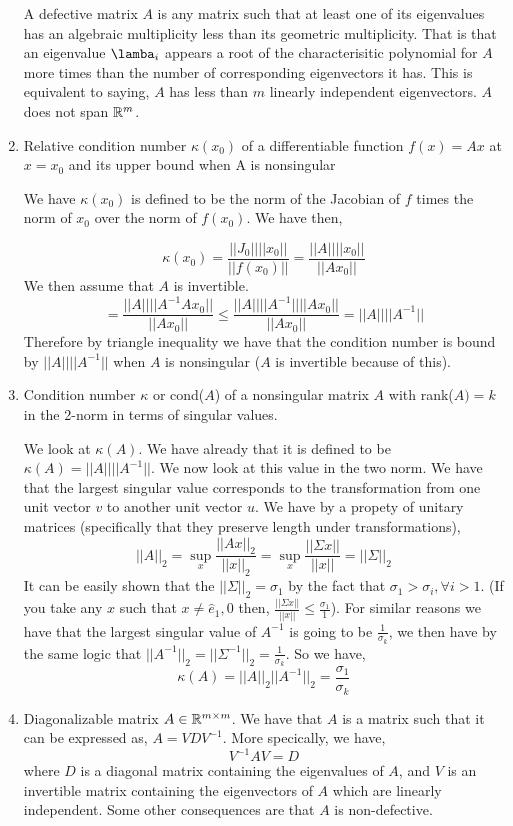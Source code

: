\documentclass{article}
\begin{document}
\begin{enumerate}
A defective matrix $A$ is any matrix such that at least one of its eigenvalues has an algebraic multiplicity less than its geometric multiplicity. That is that an eigenvalue $\lamba_i$ appears a root of the characterisitic polynomial for $A$ more times than the number of corresponding eigenvectors it has. This is equivalent to saying, $A$ has less than $m$ linearly independent eigenvectors. $A$ does not span $\mathbb{R}^{m}$. 

\item Relative condition number $\kappa(x_0)$ of a differentiable function $f(x) = Ax$ at $x = x_0$ and its upper bound when A is nonsingular

We have $\kappa(x_0)$ is defined to be the norm of the Jacobian of $f$ times the norm of $x_0$ over the norm of $f(x_0)$. We have then, 

\[
    \kappa(x_0) = \frac{||J_0||||x_0||}{||f(x_0)||} = \frac{||A||||x_0||}{||Ax_0||} 
\]
We then assume that $A$ is invertible. 
\[
     = \frac{||A||||A^{-1}Ax_0||}{||Ax_0||} \le \frac{||A||||A^{-1}||||Ax_0||}{||Ax_0||} = ||A||||A^{-1}||
\]
Therefore by triangle inequality we have that the condition number is bound by $||A||||A^{-1}||$ when $A$ is nonsingular ($A$ is invertible because of this). 

\item Condition number $\kappa$ or cond($A$) of a nonsingular matrix $A$ with rank($A) = k$ in the 2-norm in terms of singular values.

We look at $\kappa(A)$. We have already that it is defined to be $\kappa(A) = ||A||||A^{-1}||$. We now look at this value in the two norm. We have that the largest singular value corresponds to the transformation from one unit vector $v$ to another unit vector $u$. We have by a propety of unitary matrices (specifically that they preserve length under transformations), 
\[
    ||A||_2 = \sup_{x} \frac{||Ax||_2}{||x||_2} = \sup_x \frac{||\Sigma x||}{||x||} = ||\Sigma||_2
\]
It can be easily shown that the $||\Sigma||_2 = \sigma_1$ by the fact that $\sigma_1 > \sigma_i, \forall i>1$. (If you take any $x$ such that $x \neq \hat{e}_1, 0$ then, $\frac{||\Sigma x||}{||x||} \le \frac{\sigma_1}{1}$). For similar reasons we have that the largest singular value of $A^{-1}$ is going to be $\frac{1}{\sigma_k}$, we then have by the same logic that $||A^{-1}||_2 = ||\Sigma^{-1}||_2 = \frac{1}{\sigma_k}$. So we have,  
\[
    \kappa(A) = ||A||_2||A^{-1}||_2  = \frac{\sigma_1}{\sigma_k}
\]

\item Diagonalizable matrix $A \in \mathbb{R}^{m\times m}$.
We have that $A$ is a matrix such that it can be expressed as, $A = VDV^{-1}$. More specically, we have, 
\[
    V^{-1}AV = D
\]
where $D$ is a diagonal matrix containing the eigenvalues of $A$, and $V$ is an invertible matrix containing the eigenvectors of $A$ which are linearly independent. Some other consequences are that $A$ is non-defective. 



\end{enumerate}
\end{document}
